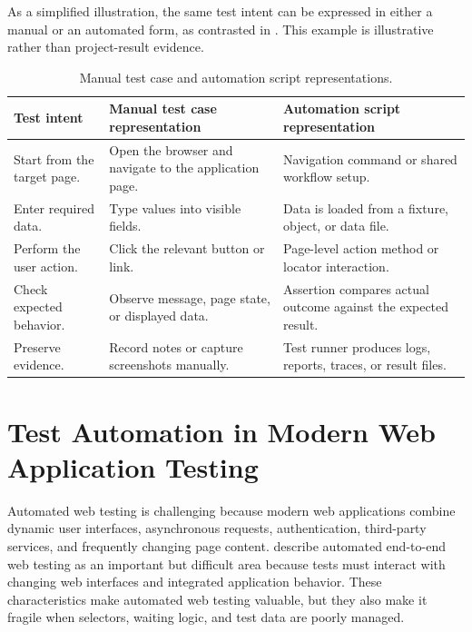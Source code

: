 As a simplified illustration, the same test intent can be expressed in either a manual or an automated form, as contrasted in . This example is illustrative rather than project-result evidence.

\begin{table}[htbp]
  \centering
  \tablefont
  \begin{tabularx}{\textwidth}{YYY}
    \toprule
    Test intent & Manual test case representation & Automation script representation \\
    \midrule
    Start from the target page. & Open the browser and navigate to the application page. & Navigation command or shared workflow setup. \\
    Enter required data. & Type values into visible fields. & Data is loaded from a fixture, object, or data file. \\
    Perform the user action. & Click the relevant button or link. & Page-level action method or locator interaction. \\
    Check expected behavior. & Observe message, page state, or displayed data. & Assertion compares actual outcome against the expected result. \\
    Preserve evidence. & Record notes or capture screenshots manually. & Test runner produces logs, reports, traces, or result files. \\
    \bottomrule
  \end{tabularx}
  \caption{Manual test case and automation script representations.}
  \label{tab:manual-automation-representations}
\end{table}

\section{Test Automation in Modern Web Application Testing}
\label{sec:ch2-modern-web-automation}

Automated web testing is challenging because modern web applications combine dynamic user interfaces, asynchronous requests, authentication, third-party services, and frequently changing page content. \textcite{leotta_e2e_web_testing_2016} describe automated end-to-end web testing as an important but difficult area because tests must interact with changing web interfaces and integrated application behavior. These characteristics make automated web testing valuable, but they also make it fragile when selectors, waiting logic, and test data are poorly managed.


